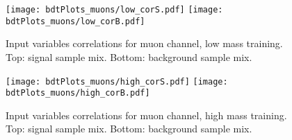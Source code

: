 \begin{figure}[tbp]
  \begin{center}
   \texttt{[image: bdtPlots\_muons/low\_corS.pdf]}
   \texttt{[image: bdtPlots\_muons/low\_corB.pdf]}
    \caption{ Input variables correlations for muon channel, low mass training. Top: signal sample mix. Bottom: background sample mix. }
    \label{fig:muon_cors_low}
  \end{center}
\end{figure}


\begin{figure}[tbp]
  \begin{center}
   \texttt{[image: bdtPlots\_muons/high\_corS.pdf]}
   \texttt{[image: bdtPlots\_muons/high\_corB.pdf]}
    \caption{ Input variables correlations for muon channel, high mass training. Top: signal sample mix. Bottom: background sample mix. }
    \label{fig:muon_cors_high}
  \end{center}
\end{figure}




